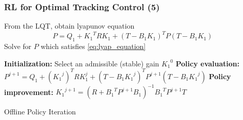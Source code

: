 \documentclass{beamer}
\begin{document}
			\begin{frame}\frametitle{RL for Optimal Tracking Control (5)}
			\vspace{3mm}
			\fontsize{8}{4}\selectfont 
			From the LQT, obtain lyapunov equation
			\begin{equation}
				P =  Q_1 + {K_1}^TRK_1 + (T - B_1K_1)^TP(T - B_1K_1)
			\label{eq:lyap_equation}
			\end{equation}		
			Solve for $ P $ which satisfies \eqref{eq:lyap_equation}
			
			\begin{algorithm}[H]
			\begin{algorithmic}[1] 	
				\fontsize{8}{4}\selectfont			
				\STATE \textbf{Initialization:} Select an admissible (stable) gain ${K_1}^0$
				\REPEAT
					\STATE 	\textbf{Policy evaluation:} 
					\STATE 	$P^{j+1} = Q_1 + ({K_1}^j)^TRK_1^j + (T-B_1{K_1}^j)^TP^{j+1}(T-B_1{K_1}^j)$
					\STATE 	
					\STATE 	\textbf{Policy improvement:} 
					\STATE 	$ {K_1}^{j+1} = (R+{B_1}^TP^{j+1}B_1)^{-1} {B_1}^TP^{j+1}T $	
				\caption{Offline Policy Iteration}
			\end{algorithmic}
			\end{algorithm}
			
			\end{frame}
			
\end{document}
